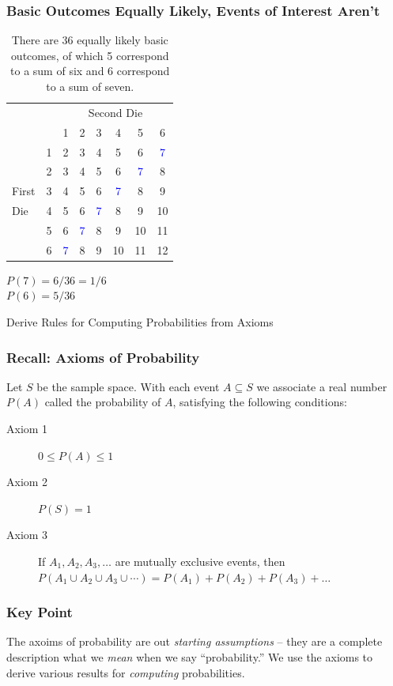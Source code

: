 \documentclass[handout]{beamer}
\begin{document}
\begin{frame}
\frametitle{Basic Outcomes Equally Likely, Events of Interest Aren't}

\begin{table}
	\begin{tabular}{|lr|cccccc|}
	\hline
	&&\multicolumn{6}{|c|}{Second Die}\\
	&&1&2&3&4&5&6\\
	\hline
	&1&2&3&4&5&\alert{6}&\textcolor{blue}{7}\\
	&2&3&4&5&\alert{6}&\textcolor{blue}{7}&8\\
	First&3&4&5&\alert{6}&\textcolor{blue}{7}&8&9\\
	Die&4&5&\alert{6}&\textcolor{blue}{7}&8&9&10\\
	&5&\alert{6}&\textcolor{blue}{7}&8&9&10&11\\
	&6&\textcolor{blue}{7}&8&9&10&11&12\\
	\hline
	\end{tabular}
	\caption{There are 36 equally likely basic outcomes, of which 5 correspond to a sum of six and 6 correspond to a sum of  seven.}
\end{table}
	\alert{$P(7) = 6/36 = 1/6$}\\
	\alert{$P(6) = 5/36$}
\end{frame}
\begin{frame}

\begin{center}\Huge Derive Rules for Computing Probabilities from Axioms\end{center}
\end{frame}
\begin{frame}
\frametitle{Recall: Axioms of Probability}

Let $S$ be the sample space. With each event $A \subseteq S$ we associate a real number $P(A)$ called the \alert{probability of $A$}, satisfying the following conditions:
\vspace{1em}
\begin{description}
	\item[Axiom 1] $0 \leq P(A) \leq 1$ 
	\item[Axiom 2] $P(S)=1$
	\item[Axiom 3] If $A_1, A_2, A_3, \hdots$ are mutually exclusive events, then $P(A_1\cup A_2 \cup A_3 \cup \cdots) = P(A_1) + P(A_2) + P(A_3) + \hdots$
\end{description}

\end{frame}
\begin{frame}
\frametitle{Key Point}
The axoims of probability are out \emph{\alert{starting assumptions}} -- they are a complete description what we \emph{\alert{mean}} when we say ``probability.'' We use the axioms to derive various results for \emph{\alert{computing}} probabilities.
\end{frame}
\end{document}
